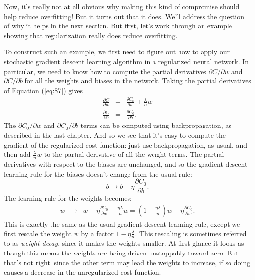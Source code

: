 \documentclass[a4paper,twoside,10pt]{book}
\begin{document}
Now, it's really not at all obvious why making this kind of compromise should help reduce overfitting! But it turns out that it does. We'll address the question of why it helps in the next section. But first, let's work through an example showing that regularization really does reduce overfitting.

To construct such an example, we first need to figure out how to apply our stochastic gradient descent learning algorithm in a regularized neural network. In particular, we need to know how to compute the partial derivatives $\partial{}C/\partial{}w$ and $\partial{}C/\partial{}b$ for all the weights and biases in the network. Taking the partial derivatives of Equation (\ref{eq:87}) gives
\begin{eqnarray} 
\frac{\partial C}{\partial w} & = & \frac{\partial C_0}{\partial w} + \frac{\lambda}{n} w \label{eq:88}\\ 
\frac{\partial C}{\partial b} & = & \frac{\partial C_0}{\partial b}. \label{eq:89}\end{eqnarray}
The $\partial{}C_0/\partial{}w$ and $\partial{}C_0/\partial{}b$ terms can be computed using backpropagation, as described in the last chapter. And so we see that it's easy to compute the gradient of the regularized cost function: just use backpropagation, as usual, and then add $\frac{\lambda}{n}w$ to the partial derivative of all the weight terms. The partial derivatives with respect to the biases are unchanged, and so the gradient descent learning rule for the biases doesn't change from the usual rule:
\begin{equation}
b\to b-\eta\frac{\partial{}C_0}{\partial{}b}.
\label{eq:90}
\end{equation}
The learning rule for the weights becomes:
\begin{eqnarray} 
w & \rightarrow & w-\eta \frac{\partial C_0}{\partial w}-\frac{\eta \lambda}{n} w  = \left(1-\frac{\eta \lambda}{n}\right) w -\eta \frac{\partial	C_0}{\partial w}. 
\label{eq:92}
\end{eqnarray}
This is exactly the same as the usual gradient descent learning rule, except we first rescale the weight $w$ by a factor $1−\eta\frac{\lambda}{n}$. This rescaling is sometimes referred to as \textit{weight decay}, since it makes the weights smaller. At first glance it looks as though this means the weights are being driven unstoppably toward zero. But that's not right, since the other term may lead the weights to increase, if so doing causes a decrease in the unregularized cost function.
\end{document}
